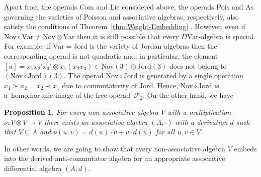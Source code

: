\documentclass[pdftex]{sigma}
\numberwithin{equation}{section}
\newtheorem{Proposition}[Theorem]{Proposition}
 { \theoremstyle{definition}
\newtheorem{Definition}[Theorem]{Definition}
\newtheorem{Note}[Theorem]{Note}
\newtheorem{Example}[Theorem]{Example}
\newtheorem{Remark}[Theorem]{Remark} }
\def\Var{\mathrm{Var}}
\def\Nov{\mathrm{Nov}}
\def\Com{\mathrm{Com}}
\def\As{\mathrm{As}}
\def\Lie{\mathrm{Lie}}
\def\Pois{\mathrm{Pois}}
\def\Jord{\mathrm{Jord}}
\begin{document}
Apart from the operads $\Com $
and $\Lie $ considered above, the operads
$\Pois$ and $\As$ governing
the varieties of Poisson and associative algebras,
respectively, also satisfy the conditions of Theorem~\ref{thm:Weight-Embedding}
\cite{KSO2019, SK-2022}.
However, even if $\Nov\circ \Var \ne \Nov\otimes\Var$
then it is still possible
that every $D\Var $-algebra is special.
For example, if $\Var = \Jord$ is the variety
of Jordan algebras then the corresponding operad
is not quadratic and, in particular,
the element
$[u]= x_1x_2'x_3'\otimes x_1(x_2x_3) \in \Nov(3)\otimes \Jord(3)$ does not belong to $(\Nov\circ \Jord)(3)$.
The operad $\Nov\circ \Jord $ is generated by a
single operation $x_1\succ x_2 = x_2\prec x_1$
due to commutativity of $\Jord $.
Hence, $\Nov\circ \Jord$ is a~homomorphic
image of the free operad~$\mathcal F_2$.
On the other hand, we have

\begin{Proposition}\label{prop:DerAComm}
For every non-associative algebra $V$ with
a multiplication $\nu \colon V\otimes V \to V$
there exists an associative algebra $(A,\cdot )$
with a derivation $d$ such that
$V\subseteq A$ and $\nu (u,v) = d(u)\cdot v + v\cdot d(u)$
for all $u,v\in V$.
\end{Proposition}

In other words, we are going to show that every
non-associative algebra $V$ embeds into the derived
anti-commutator algebra  for an appropriate
associative differential algebra $(A,d)$.
\end{document}
